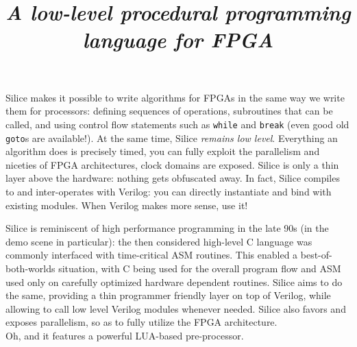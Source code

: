 \documentclass[a4]{article}
\title{\silice{}\\ \textit{\normalsize A low-level procedural programming language for FPGA}}
\newcommand\verilog{Verilog}
\newcommand\silice{Silice}
\begin{document}
\maketitle

\silice{} makes it possible to write algorithms for FPGAs in the same way we write them for processors: defining sequences of operations, subroutines that can be called, and using control flow statements such as \texttt{while} and \texttt{break} (even good old \texttt{goto}s are available!). 
At the same time, \silice{} \textit{remains low level}. Everything an algorithm does is precisely timed, you can fully exploit the parallelism and niceties of FPGA architectures, clock domains are exposed. 
\silice{} is only a thin layer above the hardware: nothing gets obfuscated away. In fact, \silice{} compiles to and inter-operates with \verilog{}: you can directly instantiate and bind with existing modules. When \verilog{} makes more sense, use it!

\silice{} is reminiscent of high performance programming in the late 90s (in the demo scene in particular): the then considered high-level C language was commonly interfaced with time-critical ASM routines. This enabled a best-of-both-worlds situation, with C being used for the overall program flow and ASM used only on carefully optimized hardware dependent routines.
%
\silice{} aims to do the same, providing a thin programmer friendly layer on top of \verilog{}, while allowing to call low level \verilog{} modules whenever needed.
\silice{} also favors and exposes parallelism, so as to fully utilize the FPGA architecture.\\

Oh, and it features a powerful LUA-based pre-processor.\\

\end{document}
